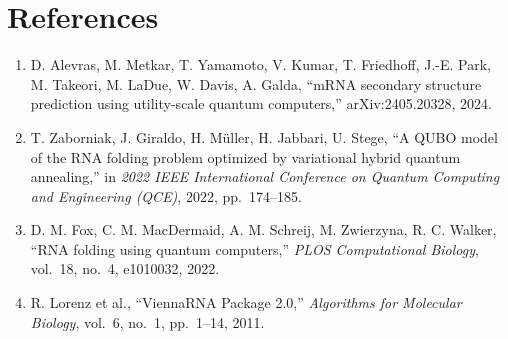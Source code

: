 \documentclass[11pt,a4paper]{article}
\begin{document}
	\section*{References}
	\begin{enumerate}[leftmargin=1.2cm]
		\item D. Alevras, M. Metkar, T. Yamamoto, V. Kumar, T. Friedhoff, J.-E. Park, M. Takeori, M. LaDue, W. Davis, A. Galda, ``mRNA secondary structure prediction using utility-scale quantum computers,'' arXiv:2405.20328, 2024.
		\item T. Zaborniak, J. Giraldo, H. M\"uller, H. Jabbari, U. Stege, ``A QUBO model of the RNA folding problem optimized by variational hybrid quantum annealing,'' in \textit{2022 IEEE International Conference on Quantum Computing and Engineering (QCE)}, 2022, pp.\ 174--185.
		\item D. M. Fox, C. M. MacDermaid, A. M. Schreij, M. Zwierzyna, R. C. Walker, ``RNA folding using quantum computers,'' \textit{PLOS Computational Biology}, vol.\ 18, no.\ 4, e1010032, 2022.
		\item R. Lorenz et al., ``ViennaRNA Package 2.0,'' \textit{Algorithms for Molecular Biology}, vol.\ 6, no.\ 1, pp.\ 1--14, 2011.
	\end{enumerate}
	
\end{document}
